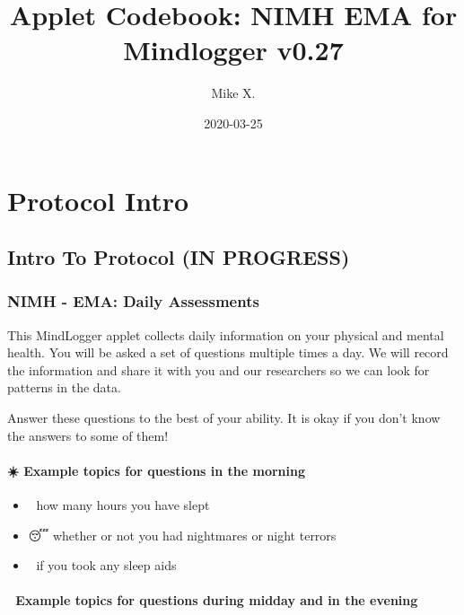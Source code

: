 \documentclass[]{book}
\title{Applet Codebook: NIMH EMA for Mindlogger v0.27}
\author{Mike X.}
\date{2020-03-25}
\providecommand{\tightlist}{%
  \setlength{\itemsep}{0pt}\setlength{\parskip}{0pt}}
\begin{document}
\maketitle

{
\setcounter{tocdepth}{1}
\tableofcontents
}
\hypertarget{part-protocol-intro}{%
\part{Protocol Intro}\label{part-protocol-intro}}

\hypertarget{intro}{%
\chapter*{Intro To Protocol (IN PROGRESS)}\label{intro}}

\hypertarget{nimh---ema-daily-assessments}{%
\section{NIMH - EMA: Daily Assessments}\label{nimh---ema-daily-assessments}}

This MindLogger applet collects daily information on your physical and mental health.
You will be asked a set of questions multiple times a day. We will record the information and share it with you and our researchers so we can look for patterns in the data.

Answer these questions to the best of your ability. It is okay if you don't know the answers to some of them!

\hypertarget{example-topics-for-questions-in-the-morning}{%
\subsection{☀️ Example topics for questions in the morning}\label{example-topics-for-questions-in-the-morning}}

\begin{itemize}
\tightlist
\item
  🛌 how many hours you have slept
\item
  😴 whether or not you had nightmares or night terrors
\item
  💊 if you took any sleep aids
\end{itemize}

\hypertarget{example-topics-for-questions-during-midday-and-in-the-evening}{%
\subsection{🌙 Example topics for questions during midday and in the evening}\label{example-topics-for-questions-during-midday-and-in-the-evening}}
\end{document}
